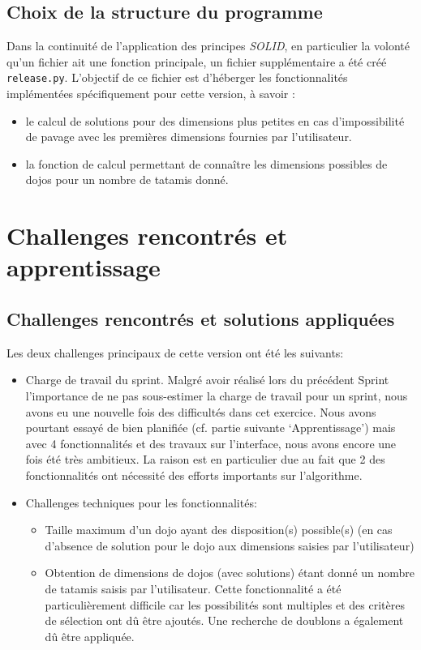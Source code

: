 \subsection{Choix de la structure du programme}

Dans la continuité de l’application des principes \emph{SOLID}, en particulier la volonté qu’un fichier 
ait une fonction principale, un fichier supplémentaire a été créé \texttt{release.py}. 
L’objectif de ce fichier est d'héberger les fonctionnalités implémentées spécifiquement pour 
cette version, à savoir :
\begin{itemize}
    \item le calcul de solutions pour des dimensions plus petites en cas d’impossibilité de 
    pavage avec les premières dimensions fournies par l’utilisateur.
    \item la fonction de calcul permettant de connaître les dimensions possibles de dojos 
    pour un nombre de tatamis donné.
\end{itemize}

\section{Challenges rencontrés et apprentissage}

\subsection{Challenges rencontrés et solutions appliquées}

Les deux challenges principaux de cette version ont été les suivants:
\begin{itemize}
    \item Charge de travail du sprint. Malgré avoir réalisé lors du précédent Sprint 
    l’importance de ne pas sous-estimer la charge de travail pour un sprint, nous avons eu 
    une nouvelle fois des difficultés dans cet exercice. Nous avons pourtant essayé de bien 
    planifiée (cf. partie suivante ‘Apprentissage’) mais avec 4 fonctionnalités et des travaux 
    sur l’interface, nous avons encore une fois été très ambitieux. La raison est en particulier 
    due au fait que 2 des fonctionnalités ont nécessité des efforts importants sur l'algorithme.
    \item Challenges techniques pour les fonctionnalités:
    \begin{itemize}
        \item Taille maximum d’un dojo ayant des disposition(s) possible(s) (en cas d’absence 
        de solution pour le dojo aux dimensions saisies par l’utilisateur)
        \item Obtention de dimensions de dojos (avec solutions) étant donné un nombre de tatamis 
        saisis par l’utilisateur. Cette fonctionnalité a été particulièrement difficile car les 
        possibilités sont multiples et des critères de sélection ont dû être ajoutés. Une recherche 
        de doublons a également dû être appliquée.
    \end{itemize}
\end{itemize}

